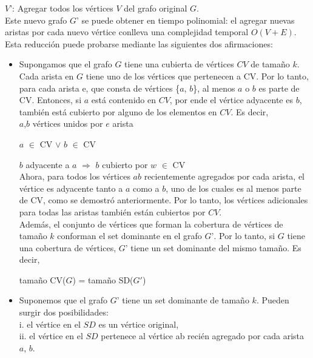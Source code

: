 \textbf{$V’$}: Agregar todos los vértices $V$ del grafo original $G$.\\

Este nuevo grafo $G’$ se puede obtener en tiempo polinomial: el agregar nuevas aristas por cada nuevo vértice conlleva una complejidad temporal $O(V + E)$. Esta reducción puede probarse mediante las siguientes dos afirmaciones:\\

\begin{itemize}

\item Supongamos que el grafo $G$ tiene una cubierta de vértices $CV$ de tamaño $k$. Cada arista en $G$ tiene uno de los vértices que pertenecen a CV. Por lo tanto, para cada arista e, que consta de vértices \{$a$, $b$\}, al menos $a$ o $b$ es parte de CV. Entonces, si $a$ está contenido en $CV$, por ende el vértice adyacente es $b$, también está cubierto por alguno de los elementos en $CV$. Es decir,\\

$a$,$b$ vértices unidos por $e$ arista

$a$ $\in$ CV \>\>\>\>\>      $\vee$ \>\>\>\>\>      $b$ $\in$  CV

$b$ adyacente a $a$ \>\>\>\>\>     $\Rightarrow$ \>\>\>\>\>     $b$ cubierto por $w$ $\in$ CV\\       	 

Ahora, para todos los vértices $ab$ recientemente agregados por cada arista, el vértice es adyacente tanto a $a$ como a $b$, uno de los cuales es al menos parte de CV, como se demostró anteriormente. Por lo tanto, los vértices adicionales para todas las aristas también están cubiertos por $CV$.\\

Además, el conjunto de vértices que forman la cobertura de vértices de tamaño $k$ conforman el set dominante en el grafo $G’$. Por lo tanto, si $G$ tiene una cobertura de vértices, $G’$ tiene un set dominante del mismo tamaño. Es decir, 

\begin{center}tamaño CV($G$) = tamaño SD($G'$)\end{center}


\item Suponemos que el grafo $G’$ tiene un set dominante de tamaño $k$. Pueden surgir dos posibilidades:\\
i. el vértice en el $SD$ es un vértice original,\\
ii. el vértice en el $SD$ pertenece al vértice ab recién agregado por cada arista {$a$, $b$}.\\


\end{itemize}
